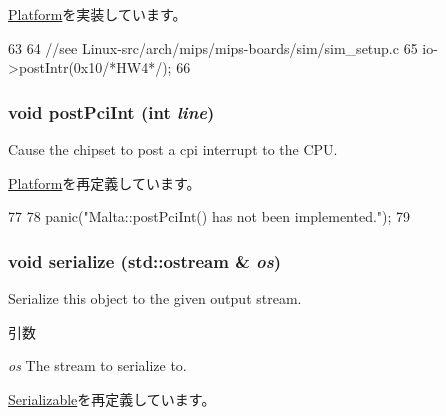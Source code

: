 \hyperlink{classPlatform_a24ab6780a0fa391b19980027355ba467}{Platform}を実装しています。


\begin{DoxyCode}
63 {
64     //see {Linux-src}/arch/mips/mips-boards/sim/sim_setup.c
65     io->postIntr(0x10/*HW4*/);
66 }
\end{DoxyCode}
\hypertarget{classMalta_a545d1445357706d7259aa73104f44222}{
\subsubsection[{postPciInt}]{\setlength{\rightskip}{0pt plus 5cm}void postPciInt (int {\em line})}}
\label{classMalta_a545d1445357706d7259aa73104f44222}
Cause the chipset to post a cpi interrupt to the CPU. 

\hyperlink{classPlatform_a545d1445357706d7259aa73104f44222}{Platform}を再定義しています。


\begin{DoxyCode}
77 {
78     panic("Malta::postPciInt() has not been implemented.");
79 }
\end{DoxyCode}
\hypertarget{classMalta_a53e036786d17361be4c7320d39c99b84}{
\subsubsection[{serialize}]{\setlength{\rightskip}{0pt plus 5cm}void serialize (std::ostream \& {\em os})}}
\label{classMalta_a53e036786d17361be4c7320d39c99b84}
Serialize this object to the given output stream. 
\begin{DoxyParams}{引数}
\item[{\em os}]The stream to serialize to. \end{DoxyParams}


\hyperlink{classSerializable_ad6272f80ae37e8331e3969b3f072a801}{Serializable}を再定義しています。


